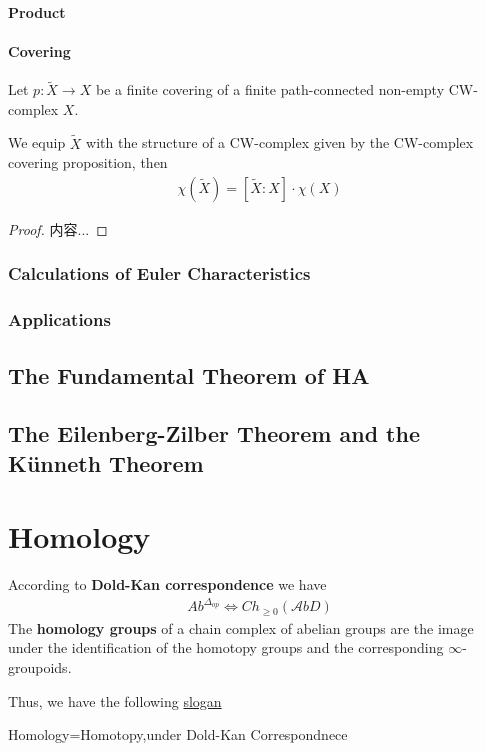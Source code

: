 \documentclass[Total.tex]{subfiles}
\begin{document}
				\subsubsection{Product}
				\subsubsection{Covering}	
					\begin{proposition}
						Let $p:\tilde{X}\rightarrow X$ be a finite covering of a finite path-connected non-empty CW-complex $X$.
						
						We equip $\tilde{X}$ with the structure of a CW-complex given by the CW-complex covering proposition, then
						\begin{gather*}
							\chi(\tilde{X})=[\tilde{X}:X]\cdot \chi(X)
						\end{gather*}
					\end{proposition}
					\begin{proof}
						内容...
					\end{proof}
				\subsection{Calculations of Euler Characteristics}
				\subsection{Applications}
		\section{The Fundamental Theorem of HA}
		\section{The Eilenberg-Zilber Theorem and the Künneth Theorem
		}
	\chapter{Homology}
		According to \textbf{Dold-Kan correspondence} we have
		\begin{gather*}
			Ab^{\Delta_{op}}\Leftrightarrow Ch_{\geq 0}({\mathcal AbD})
		\end{gather*}
		The \textbf{homology groups} of a chain complex of abelian groups are the image under the identification of the homotopy groups and the corresponding $\infty$-groupoids. 
		
		Thus, we have the following \underline{slogan}
		\begin{center}
			Homology=Homotopy,under Dold-Kan Correspondnece
		\end{center}
\end{document}
